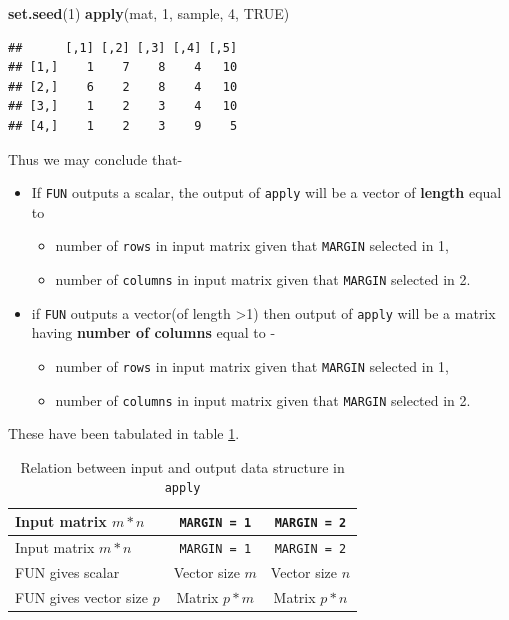 \documentclass[
]{book}
\newenvironment{Shaded}{\begin{snugshade}}{\end{snugshade}}
\newcommand{\ConstantTok}[1]{\textcolor[rgb]{0.56,0.35,0.01}{#1}}
\newcommand{\DecValTok}[1]{\textcolor[rgb]{0.00,0.00,0.81}{#1}}
\newcommand{\FunctionTok}[1]{\textcolor[rgb]{0.13,0.29,0.53}{\textbf{#1}}}
\newcommand{\NormalTok}[1]{#1}
\providecommand{\tightlist}{%
  \setlength{\itemsep}{0pt}\setlength{\parskip}{0pt}}
\begin{document}
\begin{Shaded}
\begin{Highlighting}[]
\FunctionTok{set.seed}\NormalTok{(}\DecValTok{1}\NormalTok{)}
\FunctionTok{apply}\NormalTok{(mat, }\DecValTok{1}\NormalTok{, sample, }\DecValTok{4}\NormalTok{, }\ConstantTok{TRUE}\NormalTok{)}
\end{Highlighting}
\end{Shaded}

\begin{verbatim}
##      [,1] [,2] [,3] [,4] [,5]
## [1,]    1    7    8    4   10
## [2,]    6    2    8    4   10
## [3,]    1    2    3    4   10
## [4,]    1    2    3    9    5
\end{verbatim}

Thus we may conclude that-

\begin{itemize}
\tightlist
\item
  If \texttt{FUN} outputs a scalar, the output of \texttt{apply} will be a vector of \textbf{length} equal to

  \begin{itemize}
  \tightlist
  \item
    number of \texttt{rows} in input matrix given that \texttt{MARGIN} selected in 1,
  \item
    number of \texttt{columns} in input matrix given that \texttt{MARGIN} selected in 2.
  \end{itemize}
\item
  if \texttt{FUN} outputs a vector(of length \textgreater1) then output of \texttt{apply} will be a matrix having \textbf{number of columns} equal to -

  \begin{itemize}
  \tightlist
  \item
    number of \texttt{rows} in input matrix given that \texttt{MARGIN} selected in 1,
  \item
    number of \texttt{columns} in input matrix given that \texttt{MARGIN} selected in 2.
  \end{itemize}
\end{itemize}

These have been tabulated in table \ref{tab:apply}.

\begin{longtable}[]{@{}lcc@{}}
\caption{\label{tab:apply} Relation between input and output data structure in \texttt{apply}}\tabularnewline
\toprule\noalign{}
Input matrix \(m*n\) & \texttt{MARGIN\ =\ 1} & \texttt{MARGIN\ =\ 2} \\
\midrule\noalign{}
\endfirsthead
\toprule\noalign{}
Input matrix \(m*n\) & \texttt{MARGIN\ =\ 1} & \texttt{MARGIN\ =\ 2} \\
\midrule\noalign{}
\endhead
\bottomrule\noalign{}
\endlastfoot
FUN gives scalar & Vector size \(m\) & Vector size \(n\) \\
FUN gives vector size \(p\) & Matrix \(p*m\) & Matrix \(p*n\) \\
\end{longtable}
\end{document}

